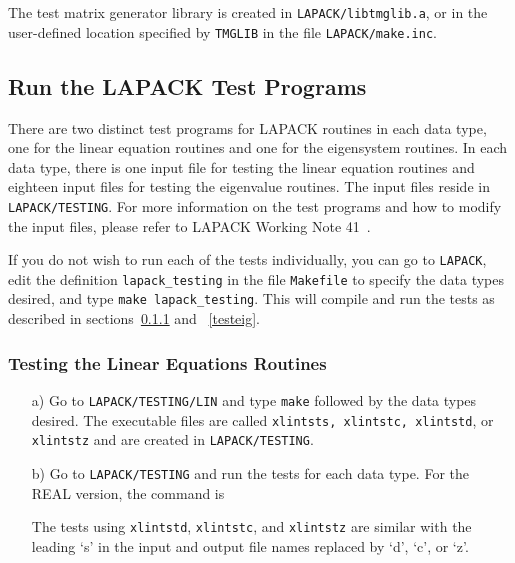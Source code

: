 \documentclass[11pt]{report}
\begin{document}
\noindent
The test matrix generator library is created in \texttt{LAPACK/libtmglib.a},
or in the user-defined location specified by \texttt{TMGLIB} in the file
\texttt{LAPACK/make.inc}.

\subsection{Run the LAPACK Test Programs}

There are two distinct test programs for LAPACK routines
in each data type, one for the linear equation routines and
one for the eigensystem routines.
In each data type, there is one input file for testing the linear
equation routines and eighteen input files for testing the eigenvalue
routines.
The input files reside in \texttt{LAPACK/TESTING}.
For more information on the test programs and how to modify the
input files, please refer to LAPACK Working Note 41~\cite{WN41}.

If you do not wish to run each of the tests individually, you can
go to \texttt{LAPACK}, edit the definition \texttt{lapack\_testing} in the file
\texttt{Makefile} to specify the data types desired, and type \texttt{make
lapack\_testing}.  This will
compile and run the tests as described in sections~\ref{testlin}
and ~\ref{testeig}.


\subsubsection{Testing the Linear Equations Routines}\label{testlin}

\begin{itemize}

\item[a)]
Go to \texttt{LAPACK/TESTING/LIN} and type \texttt{make} followed by the data types
desired.  The executable files are called \texttt{xlintsts, xlintstc,
xlintstd}, or \texttt{xlintstz} and are created in \texttt{LAPACK/TESTING}.

\item[b)]
Go to \texttt{LAPACK/TESTING} and run the tests for each data type.
For the REAL version, the command is

\noindent
The tests using \texttt{xlintstd}, \texttt{xlintstc}, and \texttt{xlintstz} are similar
with the leading `s' in the input and output file names replaced
by `d', `c', or `z'.

\end{itemize}
\end{document}
